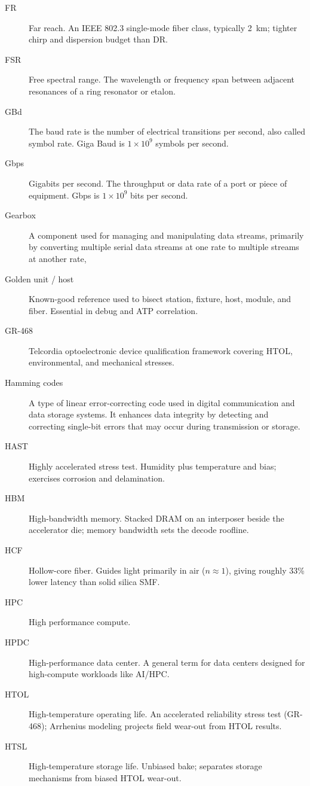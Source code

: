 \begin{description}
\item[FR] Far reach. An IEEE 802.3 single-mode fiber class, typically 2~km; tighter chirp and dispersion budget than DR.
\item[FSR] Free spectral range. The wavelength or frequency span between adjacent resonances of a ring resonator or etalon.
\item[GBd] The baud rate is the number of electrical transitions per second, also called symbol rate. Giga Baud is $1\times10^{9}$ symbols per second.
\item[Gbps] Gigabits per second. The throughput or data rate of a port or piece of equipment. Gbps is $1\times10^{9}$ bits per second.
\item[Gearbox] A component used for managing and manipulating data streams, primarily by converting multiple serial data streams at one rate to multiple streams at another rate,
\item[Golden unit / host] Known-good reference used to bisect station, fixture, host, module, and fiber. Essential in debug and ATP correlation.
\item[GR-468] Telcordia optoelectronic device qualification framework covering HTOL, environmental, and mechanical stresses.
\item[Hamming codes] A type of linear error-correcting code used in digital communication and data storage systems. It enhances data integrity by detecting and correcting single-bit errors that may occur during transmission or storage.
\item[HAST] Highly accelerated stress test. Humidity plus temperature and bias; exercises corrosion and delamination.
\item[HBM] High-bandwidth memory. Stacked DRAM on an interposer beside the accelerator die; memory bandwidth sets the decode roofline.
\item[HCF] Hollow-core fiber. Guides light primarily in air ($n\approx1$), giving roughly 33\% lower latency than solid silica SMF.
\item[HPC] High performance compute.
\item[HPDC] High-performance data center. A general term for data centers designed for high-compute workloads like AI/HPC.
\item[HTOL] High-temperature operating life. An accelerated reliability stress test (GR-468); Arrhenius modeling projects field wear-out from HTOL results.
\item[HTSL] High-temperature storage life. Unbiased bake; separates storage mechanisms from biased HTOL wear-out.

\end{description}
